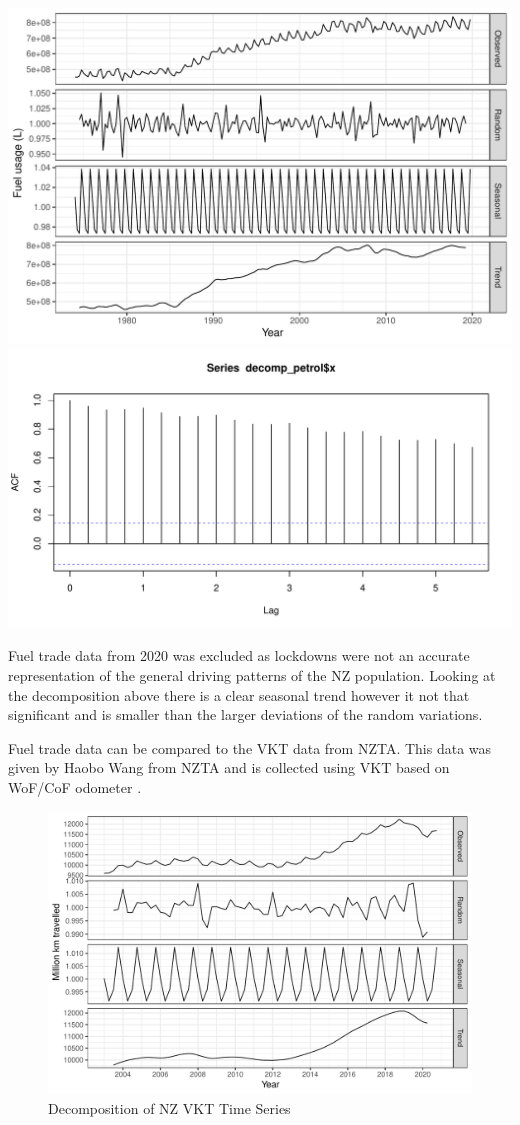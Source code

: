 \documentclass[
]{article}
\begin{document}
\includegraphics{summary_week4_files/figure-latex/petrol_ts-1.pdf}
\includegraphics{summary_week4_files/figure-latex/unnamed-chunk-2-1.pdf}

Fuel trade data from 2020 was excluded as lockdowns were not an accurate
representation of the general driving patterns of the NZ population.
Looking at the decomposition above there is a clear seasonal trend
however it not that significant and is smaller than the larger
deviations of the random variations.

Fuel trade data can be compared to the VKT data from NZTA. This data was
given by Haobo Wang from NZTA and is collected using VKT based on
WoF/CoF odometer \cite{NZTA_VKT}.

\begin{figure}
\centering
\includegraphics{summary_week4_files/figure-latex/VKT_ts-1.pdf}
\caption{Decomposition of NZ VKT Time Series}
\end{figure}
\end{document}
